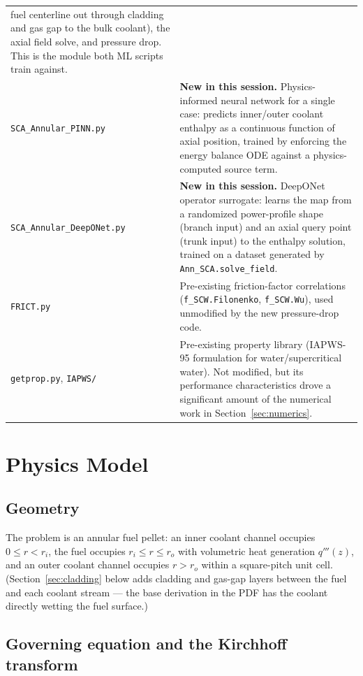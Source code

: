 \documentclass[11pt]{article}
\begin{document}
\begin{longtable}{@{}p{}p{}@{}}
fuel centerline out through cladding and gas gap to the bulk coolant),
the axial field solve, and pressure drop. This is the module both ML
scripts train against. \\
\texttt{SCA\_Annular\_PINN.py} &
\textbf{New in this session.} Physics-informed neural network for a single
case: predicts inner/outer coolant enthalpy as a continuous function of
axial position, trained by enforcing the energy balance ODE against a
physics-computed source term. \\
\texttt{SCA\_Annular\_DeepONet.py} &
\textbf{New in this session.} DeepONet operator surrogate: learns the map
from a randomized power-profile shape (branch input) and an axial query
point (trunk input) to the enthalpy solution, trained on a dataset
generated by \texttt{Ann\_SCA.solve\_field}. \\
\texttt{FRICT.py} &
Pre-existing friction-factor correlations (\texttt{f\_SCW.Filonenko},
\texttt{f\_SCW.Wu}), used unmodified by the new pressure-drop code. \\
\texttt{getprop.py}, \texttt{IAPWS/} &
Pre-existing property library (IAPWS-95 formulation for water/supercritical
water). Not modified, but its performance characteristics drove a
significant amount of the numerical work in Section~\ref{sec:numerics}. \\
\bottomrule
\end{longtable}

\section{Physics Model}
\label{sec:physics}

\subsection{Geometry}

The problem is an annular fuel pellet: an inner coolant channel occupies
$0 \le r < r_i$, the fuel occupies $r_i \le r \le r_o$ with volumetric heat
generation $q'''(z)$, and an outer coolant channel occupies $r > r_o$
within a square-pitch unit cell. (Section~\ref{sec:cladding} below adds
cladding and gas-gap layers between the fuel and each coolant stream ---
the base derivation in the PDF has the coolant directly wetting the fuel
surface.)

\subsection{Governing equation and the Kirchhoff transform}
\end{document}
